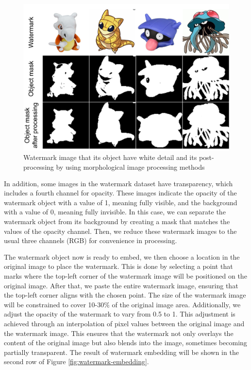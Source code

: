 \begin{figure}[t]
    \centering
    \includegraphics[width=0.8\linewidth]{img/wtm_embed_processing.png}
    \caption[Watermark image morphological image processing methods]{Watermark image that its object have white detail and its post-processing by using morphological image processing methods}
    \label{fig:wtm-with-white-detail}
\end{figure}

In addition, some images in the watermark dataset have transparency, which includes a fourth channel for opacity. These images indicate the opacity of the watermark object with a value of 1, meaning fully visible, and the background with a value of 0, meaning fully invisible. In this case, we can separate the watermark object from its background by creating a mask that matches the values of the opacity channel. Then, we reduce these watermark images to the usual three channels (RGB) for convenience in processing.

The watermark object now is ready to embed, we then choose a location in the original image to place the watermark. This is done by selecting a point that marks where the top-left corner of the watermark image will be positioned on the original image. After that, we paste the entire watermark image, ensuring that the top-left corner aligns with the chosen point. The size of the watermark image will be constrained to cover 10-30\% of the original image area. Additionally, we adjust the opacity of the watermark to vary from 0.5 to 1. This adjustment is achieved through an interpolation of pixel values between the original image and the watermark image. This ensures that the watermark not only overlays the content of the original image but also blends into the image, sometimes becoming partially transparent. The result of watermark embedding will be shown in the second row of Figure \ref{fig:watermark-embedding}.

